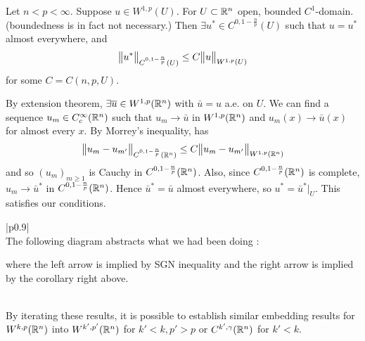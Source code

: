 \documentclass[10pt,a4paper]{report}
\newenvironment{proof}
{\begin{changemargin}{1cm}{0.5cm} 
	}%
	{\end{changemargin}
}
\begin{document}
\corr Let $n< p < \infty$. Suppose $u \in W^{1,p} (U)$. For $U\subset \mathbb{R}^n$ open, bounded $C^{1}$-domain. (boundedness is in fact not necessary.) Then $\exists u^* \in C^{0,1-\frac{n}{p}}(U)$ such that $u = u^*$ almost everywhere, and
\begin{align*}
\bigl\lVert u^*\bigr\rVert_{C^{0,1-\frac{n}{p}}(U)} \leq C \bigl\lVert u\bigr\rVert_{W^{1,p}(U)}
\end{align*}
for some $C = C(n,p,U)$.
\begin{proof}
\pf By extension theorem, $\exists \overline{u} \in W^{1,p}(\mathbb{R}^n)$ with $\bar{u} =u$ a.e. on $U$. We can find a sequence $u_m \in C_c^{\infty}(\mathbb{R}^n)$ such that $u_m \rightarrow \bar{u}$ in $W^{1,p}(\mathbb{R}^n)$ and $u_m(x) \rightarrow \bar{u}(x)$ for almost every $x$. By Morrey's inequality, has
\begin{align*}
\bigl\lVert u_m -u_{m'}\bigr\rVert_{C^{0,1-\frac{n}{p}}(\mathbb{R}^n)} \leq C \bigl\lVert u_m - u_{m'}\bigr\rVert_{W^{1,p}(\mathbb{R}^n)}
\end{align*}
and so $(u_m)_{m\geq 1}$ is Cauchy in $C^{0, 1-\frac{n}{p}}(\mathbb{R}^n)$. Also, since $C^{0, 1-\frac{n}{p}}(\mathbb{R}^n)$ is complete, $u_m \rightarrow \bar{u}^*$ in $C^{0,1-\frac{n}{p}}(\mathbb{R}^n)$. Hence $\bar{u}^* = \bar{u}$ almost everywhere, so $u^* = \bar{u}^* \big|_{U}$. This satisfies our conditions.

\eop
\end{proof}
\s

\begin{tabular}{|p{}|}
\hline\\
The following diagram abstracts what we had been doing :

\begin{center}
\begin{large}
\end{large}
\end{center}
where the left arrow is implied by SGN inequality and the right arrow is implied by the corollary right above.
\\\\\hline
\end{tabular}
\s

By iterating these results, it is possible to establish similar embedding results for $W^{k,p}(\mathbb{R}^n)$ into $W^{k',p'}(\mathbb{R}^n)$ for $k'<k, p'>p$ or $C^{k',\gamma}(\mathbb{R}^n)$ for $k'<k$.
\s
\end{document}
